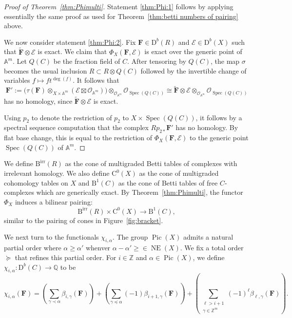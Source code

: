 \documentclass[12pt]{amsart}
\theoremstyle{definition}
\theoremstyle{remark}
\newcommand{\Spec}{\operatorname{Spec}}
\newcommand{\Pic}{\operatorname{Pic}}
\newcommand{\NE}{\operatorname{NE}}
\renewcommand{\AA}{\mathbb{A}}
\newcommand{\ZZ}{\mathbb{Z}}
\newcommand{\QQ}{\mathbb{Q}}
\newcommand{\cO}{\mathcal{O}}
\newcommand{\cE}{\mathcal{E}}
\newcommand{\FF}{\mathbf{F}}
\newcommand{\DD}{\mathrm{D}}
\newcommand{\CQ}{\mathrm{C}}
\newcommand{\BBQ}{\mathrm{B}}
\newcommand{\BBirr}{{\mathrm{B}}^{\text{irr}}}
\begin{document}
\begin{proof}[Proof of Theorem~\ref{thm:Phimulti}]
Statement \eqref{thm:Phi:1} follows by applying essentially the same proof as used for Theorem~\ref{thm:betti numbers of pairing} above.  

We now consider statement \eqref{thm:Phi:2}. Fix $\FF\in \DD^b(R)$ and $\cE\in \DD^b(X)$ such that $\widetilde{\FF}\otimes \cE$ is exact.  We claim that $\Phi_X(\FF,\cE)$ is exact over the generic point of $\AA^m$.  Let $Q(C)$ be the fraction field of $C$.  After tensoring by $Q(C)$, the map $\sigma$ becomes the usual inclusion $R\subset R\otimes Q(C)$ followed by the invertible change of variables $f\mapsto ft^{\deg(f)}$.  It follows that
\[
\FF':= \bigl(\tau(\FF)\otimes_{X\times\AA^{m}} (\cE\boxtimes \cO_{\AA^{m}}) \bigr)\otimes_{\cO_{\AA^m}} \cO_{\Spec(Q(C))}
 \cong
 \widetilde{\FF} \otimes \cE\otimes_{\cO_{\AA^m}} \cO_{\Spec(Q(C))}
\]
has no homology, since $\widetilde{\FF}\otimes \cE$ is exact.


Using $p_2$ to denote the restriction of $p_2$ to $X\times \Spec(Q(C))$, it follows by a spectral sequence computation that the complex $Rp_{2*}\FF'$ has no homology.  By flat base change, this is equal to the restriction of $\Phi_{X}(\FF,\cE)$ to the generic point $\Spec(Q(C))$ of $\AA^m$.
\end{proof}


We define $\BBirr(R)$ as the cone of multigraded Betti tables of complexes with irrelevant homology.  
We also define $\CQ^0(X)$ as the cone of multigraded cohomology tables on $X$ and $\BBQ^1(C)$ as the cone of Betti tables of free $C$-complexes
which are generically exact.
By Theorem~\ref{thm:Phimulti}, the functor $\Phi_{X}$ induces a bilinear pairing:
\begin{equation}\label{eqn:toric cones}
\BBirr(R)\times \CQ^0(X)\to \BBQ^1(C),
\end{equation}
similar to the pairing of cones in Figure~\ref{fig:bracket}.  

We next turn to the functionals $\chi_{i,\alpha}$. The  group $\Pic(X)$ admits a natural partial order where $\alpha \geq \alpha'$ whenver $\alpha-\alpha'\geq \in \NE(X)$.  We fix a total order $\succeq$ that refines this partial order. For $i\in \ZZ$ and $\alpha\in \Pic(X)$,
we define $\chi_{i,\alpha}: \DD^b(C)\to \QQ$ to be
\[
\chi_{i,\alpha}(\FF)= \left(\sum_{\gamma\prec \alpha} \beta_{i,\gamma}(\FF) \right) +\left(\sum_{\gamma\preceq \alpha} (-1)\beta_{i+1,\gamma}(\FF)\right) + \left(\sum_{\substack{\ell > i+1\\ \gamma\in \ZZ^m}} (-1)^\ell\beta_{\ell,\gamma}(\FF) \right).
\]
\end{document}
